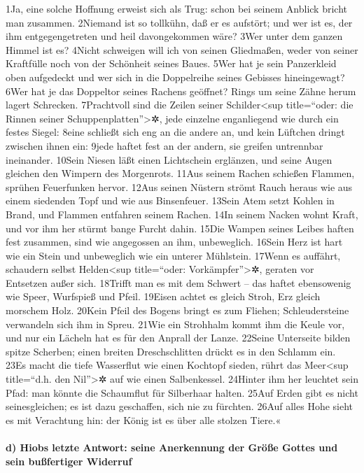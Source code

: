 1Ja, eine solche Hoffnung erweist sich als Trug: schon bei seinem
Anblick bricht man zusammen. 2Niemand ist so tollkühn, daß er es
aufstört; und wer ist es, der ihm entgegengetreten und heil
davongekommen wäre? 3Wer unter dem ganzen Himmel ist es? 4Nicht
schweigen will ich von seinen Gliedmaßen, weder von seiner Kraftfülle
noch von der Schönheit seines Baues. 5Wer hat je sein Panzerkleid oben
aufgedeckt und wer sich in die Doppelreihe seines Gebisses hineingewagt?
6Wer hat je das Doppeltor seines Rachens geöffnet? Rings um seine Zähne
herum lagert Schrecken. 7Prachtvoll sind die Zeilen seiner
Schilder\textless sup title=``oder: die Rinnen seiner
Schuppenplatten''\textgreater✲, jede einzelne enganliegend wie durch ein
festes Siegel: 8eine schließt sich eng an die andere an, und kein
Lüftchen dringt zwischen ihnen ein: 9jede haftet fest an der andern, sie
greifen untrennbar ineinander. 10Sein Niesen läßt einen Lichtschein
erglänzen, und seine Augen gleichen den Wimpern des Morgenrots. 11Aus
seinem Rachen schießen Flammen, sprühen Feuerfunken hervor. 12Aus seinen
Nüstern strömt Rauch heraus wie aus einem siedenden Topf und wie aus
Binsenfeuer. 13Sein Atem setzt Kohlen in Brand, und Flammen entfahren
seinem Rachen. 14In seinem Nacken wohnt Kraft, und vor ihm her stürmt
bange Furcht dahin. 15Die Wampen seines Leibes haften fest zusammen,
sind wie angegossen an ihm, unbeweglich. 16Sein Herz ist hart wie ein
Stein und unbeweglich wie ein unterer Mühlstein. 17Wenn es auffährt,
schaudern selbst Helden\textless sup title=``oder:
Vorkämpfer''\textgreater✲, geraten vor Entsetzen außer sich. 18Trifft
man es mit dem Schwert -- das haftet ebensowenig wie Speer, Wurfspieß
und Pfeil. 19Eisen achtet es gleich Stroh, Erz gleich morschem Holz.
20Kein Pfeil des Bogens bringt es zum Fliehen; Schleudersteine
verwandeln sich ihm in Spreu. 21Wie ein Strohhalm kommt ihm die Keule
vor, und nur ein Lächeln hat es für den Anprall der Lanze. 22Seine
Unterseite bilden spitze Scherben; einen breiten Dreschschlitten drückt
es in den Schlamm ein. 23Es macht die tiefe Wasserflut wie einen
Kochtopf sieden, rührt das Meer\textless sup title=``d.h. den
Nil''\textgreater✲ auf wie einen Salbenkessel. 24Hinter ihm her leuchtet
sein Pfad: man könnte die Schaumflut für Silberhaar halten. 25Auf Erden
gibt es nicht seinesgleichen; es ist dazu geschaffen, sich nie zu
fürchten. 26Auf alles Hohe sieht es mit Verachtung hin: der König ist es
über alle stolzen Tiere.«

\hypertarget{d-hiobs-letzte-antwort-seine-anerkennung-der-gruxf6uxdfe-gottes-und-sein-buuxdffertiger-widerruf}{%
\paragraph{d) Hiobs letzte Antwort: seine Anerkennung der Größe Gottes
und sein bußfertiger
Widerruf}\label{d-hiobs-letzte-antwort-seine-anerkennung-der-gruxf6uxdfe-gottes-und-sein-buuxdffertiger-widerruf}}

